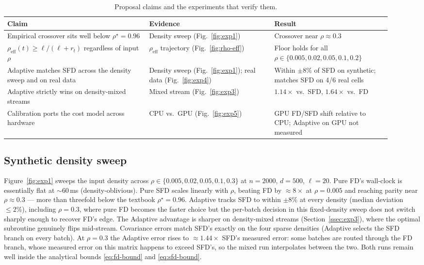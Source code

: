 \documentclass[11pt]{article}
\begin{document}
\begin{table}[t]
  \centering
  \small
  \begin{tabular}{p{0.34\linewidth} p{0.30\linewidth} p{0.28\linewidth}}
    \toprule
    \textbf{Claim} & \textbf{Evidence} & \textbf{Result} \\
    \midrule
    Empirical crossover sits well below $\rho^\star = 0.96$ &
    Density sweep (Fig.~\ref{fig:exp1}) &
    Crossover near $\rho \approx 0.3$ \\
    $\rho_{\mathrm{eff}}(t) \ge \ell/(\ell+r_t)$ regardless of input $\rho$ &
    $\rho_{\mathrm{eff}}$ trajectory (Fig.~\ref{fig:rho-eff}) &
    Floor holds for all $\rho \in \{0.005, 0.02, 0.05, 0.1, 0.2\}$ \\
    Adaptive matches SFD across the density sweep and on real data &
    Density sweep (Fig.~\ref{fig:exp1}); real data (Fig.~\ref{fig:exp4}) &
    Within $\pm 8\%$ of SFD on synthetic; matches SFD on 4/6 real cells \\
    Adaptive strictly wins on density-mixed streams &
    Mixed stream (Fig.~\ref{fig:exp3}) &
    $1.14\times$ vs.\ SFD, $1.64\times$ vs.\ FD \\
    Calibration ports the cost model across hardware &
    CPU vs.\ GPU (Fig.~\ref{fig:exp5}) &
    GPU FD/SFD shift relative to CPU; Adaptive on GPU not measured \\
    \bottomrule
  \end{tabular}
  \caption{Proposal claims and the experiments that verify them.}
  \label{tab:claims}
\end{table}

\subsection{Synthetic density sweep}
\label{ssec:exp1}

Figure~\ref{fig:exp1} sweeps the input density across
$\rho \in \{0.005, 0.02, 0.05, 0.1, 0.3\}$ at $n = 2000$, $d = 500$, $\ell = 20$.
Pure FD's wall-clock is essentially flat at $\sim$60\,ms (density-oblivious).
Pure SFD scales linearly with $\rho$, beating FD by $\approx 8\times$ at
$\rho = 0.005$ and reaching parity near $\rho \approx 0.3$ --- more than
threefold below the textbook $\rho^\star = 0.96$. Adaptive tracks SFD to
within $\pm 8\%$ at every density (median deviation $\le 2\%$), including
$\rho = 0.3$, where pure FD
becomes the faster choice but the per-batch decision in this fixed-density
sweep does not switch sharply enough to recover FD's edge. The Adaptive
advantage is sharper on density-mixed streams (Section~\ref{ssec:exp3}),
where the optimal subroutine genuinely flips mid-stream. Covariance errors
match SFD's exactly on the four sparse densities (Adaptive selects the SFD
branch on every batch). At $\rho = 0.3$ the Adaptive error rises to
$\approx 1.44\times$ SFD's measured error: some batches are routed through
the FD branch, whose measured error on this matrix happens to exceed SFD's,
so the mixed run interpolates between the two. Both runs remain well inside
the analytical bounds \eqref{eq:fd-bound} and \eqref{eq:sfd-bound}.
\end{document}
